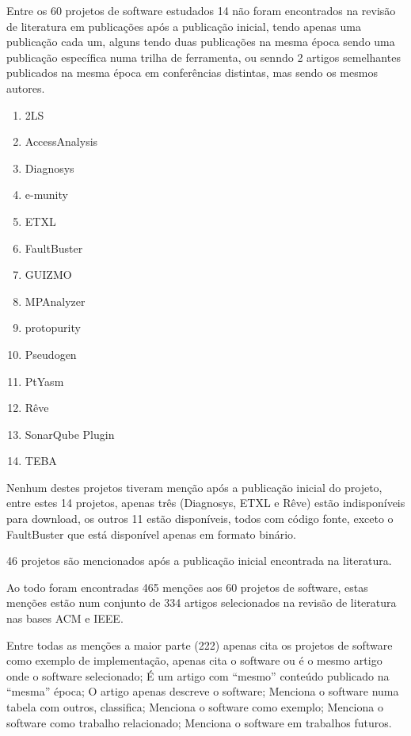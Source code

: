 

Entre os 60 projetos de software estudados 14 não foram encontrados na revisão
de literatura em publicações após a publicação inicial, tendo apenas uma
publicação cada um, alguns tendo duas publicações na mesma época sendo uma
publicação específica numa trilha de ferramenta, ou senndo 2 artigos
semelhantes publicados na mesma época em conferências distintas, mas sendo os
mesmos autores.

\begin{enumerate}
  \item 2LS
  \item AccessAnalysis
  \item Diagnosys
  \item e-munity
  \item ETXL
  \item FaultBuster
  \item GUIZMO
  \item MPAnalyzer
  \item protopurity
  \item Pseudogen
  \item PtYasm
  \item Rêve
  \item SonarQube Plugin
  \item TEBA
\end{enumerate}

Nenhum destes projetos tiveram menção após a publicação inicial do projeto,
entre estes 14 projetos, apenas três (Diagnosys, ETXL e Rêve) estão
indisponíveis para download, os outros 11 estão disponíveis, todos com código
fonte, exceto o FaultBuster que está disponível apenas em formato binário.

46 projetos são mencionados após a publicação inicial encontrada na literatura.

Ao todo foram encontradas 465 menções aos 60 projetos de software, estas
menções estão num conjunto de 334 artigos selecionados na revisão de literatura
nas bases ACM e IEEE.



Entre todas as menções a maior parte (222) apenas cita os projetos de software
como exemplo de implementação, apenas cita o software ou é o mesmo artigo onde
o software selecionado; É um artigo com “mesmo” conteúdo publicado na “mesma”
época; O artigo apenas descreve o software; Menciona o software numa tabela com
outros, classifica; Menciona o software como exemplo; Menciona o software como
trabalho relacionado; Menciona o software em trabalhos futuros.

